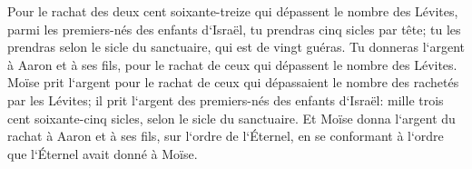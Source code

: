 \verse Pour le rachat des deux cent soixante-treize qui dépassent le nombre des Lévites, parmi les premiers-nés des enfants d`Israël, 
\verse tu prendras cinq sicles par tête; tu les prendras selon le sicle du sanctuaire, qui est de vingt guéras. 
\verse Tu donneras l`argent à Aaron et à ses fils, pour le rachat de ceux qui dépassent le nombre des Lévites. 
\verse Moïse prit l`argent pour le rachat de ceux qui dépassaient le nombre des rachetés par les Lévites; 
\verse il prit l`argent des premiers-nés des enfants d`Israël: mille trois cent soixante-cinq sicles, selon le sicle du sanctuaire. 
\verse Et Moïse donna l`argent du rachat à Aaron et à ses fils, sur l`ordre de l`Éternel, en se conformant à l`ordre que l`Éternel avait donné à Moïse. 

\chapter{}

